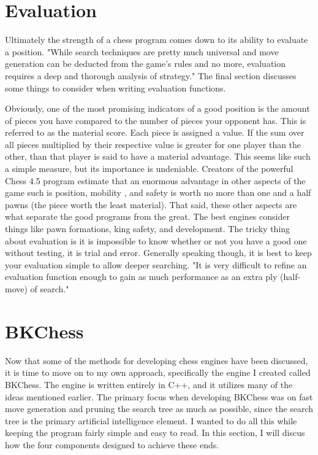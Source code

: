 \documentclass[11pt]{article}
\begin{document}
\section{Evaluation} 
Ultimately the strength of a chess program comes down to its ability to evaluate a position. "While search techniques are pretty much universal and move generation can be deducted from the game's rules and no more, evaluation requires a deep and thorough analysis of strategy\cite{laramee2000chess}." The final section discusses some things to consider when writing evaluation functions.

Obviously, one of the most promising indicators of a good position is the amount of pieces you have compared to the number of pieces your opponent has. This is referred to as the material score. Each piece is assigned a value. If the sum over all pieces multiplied by their respective value is greater for one player than the other, than that player is said to have a material advantage. This seems like such a simple measure, but its importance is undeniable. Creators of the powerful Chess 4.5 program estimate that an enormous advantage in other aspects of the game such is position, mobility , and safety is worth no more than one and a half pawns (the piece worth the least material)\cite{laramee2000chess}. That said, these other aspects are what separate the good programs from the great. The best engines consider things like pawn formations, king safety, and development. The tricky thing about evaluation is it is impossible to know whether or not you have a good one without testing, it is trial and error. Generally speaking though, it is best to keep your evaluation simple to allow deeper searching. "It is very difficult to refine an evaluation function enough to gain as much performance as an extra ply (half-move) of search\cite{laramee2000chess}."

\section{BKChess}
Now that some of the methods for developing chess engines have been discussed, it is time to move on to my own approach, specifically the engine I created called BKChess. The engine is written entirely in C++, and it utilizes many of the ideas mentioned earlier. The primary focus when developing BKChess was on fast move generation and pruning the search tree as much as possible, since the search tree is the primary artificial intelligence element. I wanted to do all this while keeping the program fairly simple and easy to read. In this section, I will discus how the four components designed to achieve these ends.
\end{document}
